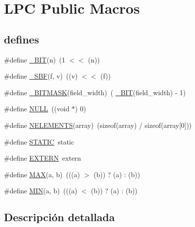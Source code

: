 \hypertarget{group___l_p_c___types___public___macros}{}\section{L\+PC Public Macros}
\label{group___l_p_c___types___public___macros}
\subsection*{\textquotesingle{}defines\textquotesingle{}}
\begin{DoxyCompactItemize}
\item 
\#define \hyperlink{group___l_p_c___types___public___macros_ga7ee022f5e5a971a8324e4b7572d49170}{\+\_\+\+B\+IT}(n)~(1 $<$$<$ (n))
\item 
\#define \hyperlink{group___l_p_c___types___public___macros_ga6caca3483c2ce446900be05ea02e8f49}{\+\_\+\+S\+BF}(f,  v)~((v) $<$$<$ (f))
\item 
\#define \hyperlink{group___l_p_c___types___public___macros_ga78ad3421dde54769e8b46d36819ae87a}{\+\_\+\+B\+I\+T\+M\+A\+SK}(field\+\_\+width)~( \hyperlink{group___l_p_c___types___public___macros_ga7ee022f5e5a971a8324e4b7572d49170}{\+\_\+\+B\+IT}(field\+\_\+width) -\/ 1)
\item 
\#define \hyperlink{group___l_p_c___types___public___macros_ga070d2ce7b6bb7e5c05602aa8c308d0c4}{N\+U\+LL}~((void $\ast$) 0)
\item 
\#define \hyperlink{group___l_p_c___types___public___macros_gafdd9296176e56fcfd83c07d345a045a7}{N\+E\+L\+E\+M\+E\+N\+TS}(array)~(sizeof(array) / sizeof(array\mbox{[}0\mbox{]}))
\item 
\#define \hyperlink{group___l_p_c___types___public___macros_ga10b2d890d871e1489bb02b7e70d9bdfb}{S\+T\+A\+T\+IC}~static
\item 
\#define \hyperlink{group___l_p_c___types___public___macros_ga77366c1bd428629dc898e188bfd182a3}{E\+X\+T\+E\+RN}~extern
\item 
\#define \hyperlink{group___l_p_c___types___public___macros_gafa99ec4acc4ecb2dc3c2d05da15d0e3f}{M\+AX}(a,  b)~(((a) $>$ (b)) ? (a) \+: (b))
\item 
\#define \hyperlink{group___l_p_c___types___public___macros_ga3acffbd305ee72dcd4593c0d8af64a4f}{M\+IN}(a,  b)~(((a) $<$ (b)) ? (a) \+: (b))
\end{DoxyCompactItemize}


\subsection{Descripción detallada}


